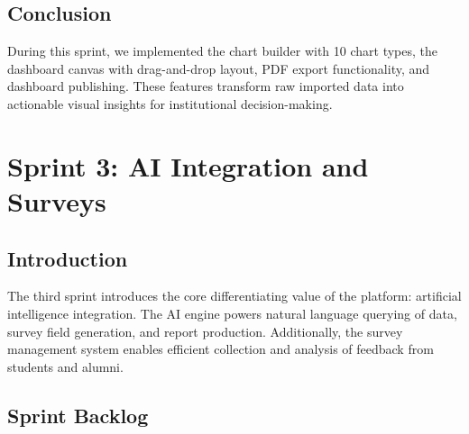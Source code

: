 \documentclass[12pt,a4paper]{report}
\begin{document}
\section{Conclusion}

During this sprint, we implemented the chart builder with 10 chart types, the dashboard canvas with drag-and-drop layout, PDF export functionality, and dashboard publishing. These features transform raw imported data into actionable visual insights for institutional decision-making.

\chapter{Sprint 3: AI Integration and Surveys}

\section{Introduction}

The third sprint introduces the core differentiating value of the platform: artificial intelligence integration. The AI engine powers natural language querying of data, survey field generation, and report production. Additionally, the survey management system enables efficient collection and analysis of feedback from students and alumni.

\section{Sprint Backlog}
\end{document}
